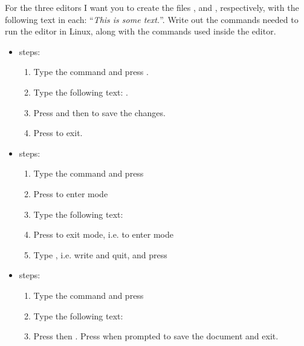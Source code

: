 \item[\textbf{Problem 2}]
For the three editors I want you to create the files ,
 and , respectively, with the following
text in each: ``\textit{This is some text.}''. Write out the commands needed to
run the editor in Linux, along with the commands used inside the editor.

\Solution

\begin{itemize}
    \item {} steps:
    \begin{enumerate}[label=(\arabic*)]
        \item Type the command  and press .
        \item Type the following text: .
        \item Press  and then  to save the changes.
        \item Press  to exit.
    \end{enumerate}
    
    \item {} steps:
    \begin{enumerate}[label=(\arabic*)]
        \item Type the command  and press 
        \item Press  to enter  mode
        \item Type the following text: 
        \item Press  to exit  mode, i.e. to enter
               mode
        \item Type , i.e. write and quit, and press 
    \end{enumerate}
    
    \item {} steps:
    \begin{enumerate}[label=(\arabic*)]
        \item Type the command  and press 
        \item Type the following text: 
        \item Press  then . Press  when
              prompted to save the document and exit.
    \end{enumerate}
\end{itemize}
